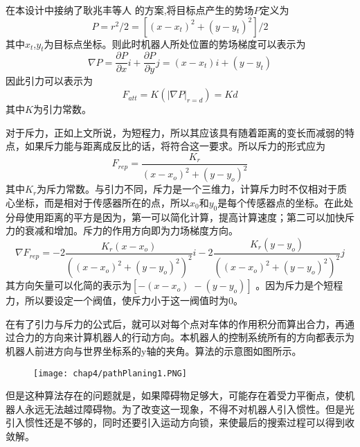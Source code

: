 在本设计中接纳了耿兆丰等人 的方案,将目标点产生的势场$P$定义为 \\
\begin{equation}
P = r^2/2 = [(x-x_t)^2+(y-y_t)^2]/2
\end{equation}
其中$x_t$,$y_t$为目标点坐标。则此时机器人所处位置的势场梯度可以表示为 \\
\begin{equation}
\nabla P = \frac{\partial P}{\partial x}i+\frac{\partial P}{\partial y}j = (x-x_t)i+(y-y_t)
\end{equation}
因此引力可以表示为 \\
\begin{equation}
F_{att} = K(|\nabla P|_{r=d})=Kd
\end{equation}
其中$K$为引力常数。

对于斥力，正如上文所说，为短程力，所以其应该具有随着距离的变长而减弱的特点，如果斥力能与距离成反比的话，将符合这一要求。所以斥力的形式应为 \\
\begin{equation}
F_{rep} = \frac{K_r}{(x-x_o)^2+(y-y_o)^2}
\end{equation}
其中$K_r$为斥力常数。与引力不同，斥力是一个三维力，计算斥力时不仅相对于质心坐标，而是相对于传感器所在的点，所以$x_0$和$y_0$是每个传感器点的坐标。在此处分母使用距离的平方是因为，第一可以简化计算，提高计算速度；第二可以加快斥力的衰减和增加。斥力的作用方向即为力场梯度方向。 \\
\begin{equation}
\nabla F_{rep} = -2\frac{K_r(x-x_o)}{((x-x_o)^2+(y-y_o)^2)^2}i-2\frac{K_r(y-y_o)}{((x-x_o)^2+(y-y_o)^2)^2}j
\end{equation}
其方向矢量可以化简的表示为$[-(x-x_o)\; -(y-y_o)]$ 。因为斥力是个短程力，所以要设定一个阀值，使斥力小于这一阀值时为0。

在有了引力与斥力的公式后，就可以对每个点对车体的作用积分而算出合力，再通过合力的方向来计算机器人的行动方向。本机器人的控制系统所有的方向都表示为机器人前进方向与世界坐标系的y轴的夹角。算法的示意图如图所示。
\begin{figure}[!htp]
  \centering
  \texttt{[image: chap4/pathPlaning1.PNG]}
\end{figure}

但是这种算法存在的问题就是，如果障碍物足够大，可能存在着受力平衡点，使机器人永远无法越过障碍物。为了改变这一现象，不得不对机器人引入惯性。但是光引入惯性还是不够的，同时还要引入运动方向锁，来使最后的搜索过程可以得到收敛解。
